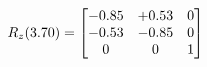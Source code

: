 \documentclass[preview]{standalone}
\begin{document}
\begin{align*}
\special{dvisvgm:raw <g id='unique000'>}R_{z}(3.70) = \begin{bmatrix}-0.85 & +0.53 & 0 \\-0.53 & -0.85 & 0 \\0 & 0 & 1\end{bmatrix}\special{dvisvgm:raw </g>}
\end{align*}
\end{document}
